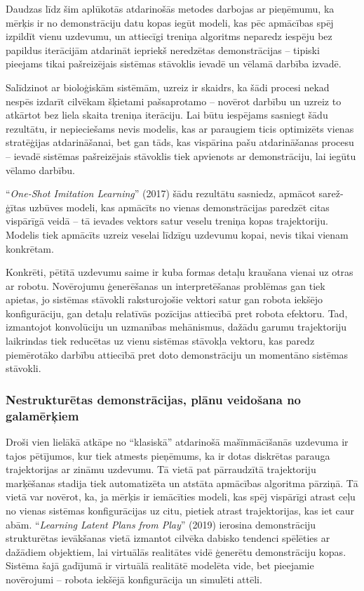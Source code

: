 \documentclass[12pt, a4paper]{article}
\numberwithin{equation}{section} %
\begin{document}
Daudzas līdz šim aplūkotās atdarinošās metodes darbojas ar pieņēmumu, ka mērķis ir no demonstrāciju datu kopas iegūt modeli, kas pēc apmācības spēj izpildīt vienu uzdevumu, un attiecīgi treniņa algoritms neparedz iespēju bez papildus iterācijām atdarināt iepriekš neredzētas demonstrācijas -- tipiski pieejams tikai pašreizējais sistēmas stāvoklis ievadē un vēlamā darbība izvadē.

Salīdzinot ar bioloģiskām sistēmām, uzreiz ir skaidrs, ka šādi procesi nekad nespēs izdarīt cilvēkam šķietami pašsaprotamo -- novērot darbību un uzreiz to atkārtot bez liela skaita treniņa iterāciju. Lai būtu iespējams sasniegt šādu rezultātu, ir nepieciešams nevis modelis, kas ar paraugiem ticis optimizēts vienas stratēģijas atdarināšanai, bet gan tāds, kas vispārina pašu atdarināšanas procesu -- ievadē sistēmas pašreizējais stāvoklis tiek apvienots ar demonstrāciju, lai iegūtu vēlamo darbību. 

``\textit{One-Shot Imitation Learning}'' \cite{duan2017one} (2017) šādu rezultātu sasniedz, apmācot sarež-ģītas uzbūves modeli, kas apmācīts no vienas demonstrācijas paredzēt citas vispārīgā veidā -- tā ievades vektors satur veselu treniņa kopas trajektoriju. Modelis tiek apmācīts uzreiz veselai līdzīgu uzdevumu kopai, nevis tikai vienam konkrētam.

Konkrēti, pētītā uzdevumu saime ir kuba formas detaļu kraušana vienai uz otras ar robotu. Novērojumu ģenerēšanas un interpretēšanas problēmas gan tiek apietas, jo sistēmas stāvokli raksturojošie vektori satur gan robota iekšējo konfigurāciju, gan detaļu relatīvās pozīcijas attiecībā pret robota efektoru. Tad, izmantojot konvolūciju un uzmanības mehānismus, dažādu garumu trajektoriju laikrindas tiek reducētas uz vienu sistēmas stāvokļa vektoru, kas paredz piemērotāko darbību attiecībā pret doto demonstrāciju un momentāno sistēmas stāvokli.

\subsubsection{Nestrukturētas demonstrācijas, plānu veidošana no galamērķiem}

Droši vien lielākā atkāpe no ``klasiskā'' atdarinošā mašīnmācīšanās uzdevuma ir tajos pētījumos, kur tiek atmests pieņēmums, ka ir dotas diskrētas parauga trajektorijas ar zināmu uzdevumu. Tā vietā pat pārraudzītā trajektoriju marķēšanas stadija tiek automatizēta un atstāta apmācības algoritma pārziņā. Tā vietā var novērot, ka, ja mērķis ir iemācīties modeli, kas spēj vispārīgi atrast ceļu no vienas sistēmas konfigurācijas uz citu, pietiek atrast trajektorijas, kas iet caur abām. ``\textit{Learning Latent Plans from Play}'' \cite{lynch2020learning} (2019) ierosina demonstrāciju strukturētas ievākšanas vietā izmantot cilvēka dabisko tendenci spēlēties ar dažādiem objektiem, lai virtuālās realitātes vidē ģenerētu demonstrāciju kopas. Sistēma šajā gadījumā ir virtuālā realitātē modelēta vide, bet pieejamie novērojumi -- robota iekšējā konfigurācija un simulēti attēli.
\end{document}

